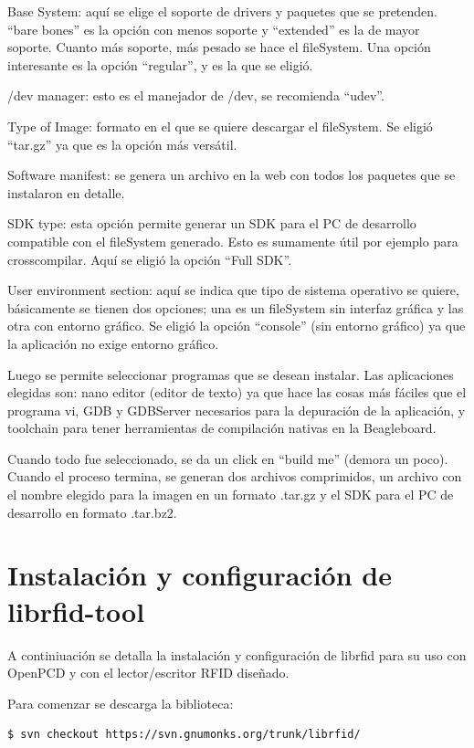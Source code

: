 \bigskip
Base System: aquí se elige el soporte de drivers y paquetes que se pretenden. “bare bones” es la opción con menos soporte y “extended” es la de mayor soporte. Cuanto más soporte, más pesado se hace el fileSystem. Una opción interesante es la opción “regular”, y es la que se eligió.

\bigskip
/dev manager: esto es el manejador de /dev, se recomienda “udev”.

\bigskip
Type of Image: formato en el que se quiere descargar el fileSystem. Se eligió “tar.gz” ya que es la opción más versátil.

\bigskip
Software manifest: se genera un archivo en la web con todos los paquetes que se instalaron en detalle.

\bigskip
SDK type: esta opción permite generar un SDK para el PC de desarrollo compatible con el fileSystem generado. Esto es sumamente útil por ejemplo para crosscompilar. Aquí se eligió la opción “Full SDK”.

\bigskip
User environment section: aquí se indica que tipo de sistema operativo se quiere, básicamente se tienen dos opciones; una es un fileSystem sin interfaz gráfica y las otra con entorno gráfico. Se eligió la opción “console” (sin entorno gráfico) ya que la aplicación no exige entorno gráfico.

\bigskip
Luego se permite seleccionar programas que se desean instalar.
Las aplicaciones elegidas son: nano editor (editor de texto) ya que hace las cosas más fáciles que el programa vi, GDB y GDBServer necesarios para la depuración de la aplicación, y toolchain para tener herramientas de compilación nativas en la Beagleboard.

\bigskip
Cuando todo fue seleccionado, se da un click en “build me” (demora un poco).
Cuando el proceso termina, se generan dos archivos comprimidos, un archivo con el nombre elegido para la imagen en un formato .tar.gz y el SDK para el PC de desarrollo en formato .tar.bz2. 


\section{Instalación y configuración de librfid-tool}\label{ins_conf_librfid}

A continiuación se detalla la instalación y configuración de librfid para su uso con OpenPCD y con el lector/escritor RFID diseñado.

\bigskip
Para comenzar se descarga la biblioteca:

\begin{verbatim}
$ svn checkout https://svn.gnumonks.org/trunk/librfid/
\end{verbatim}


